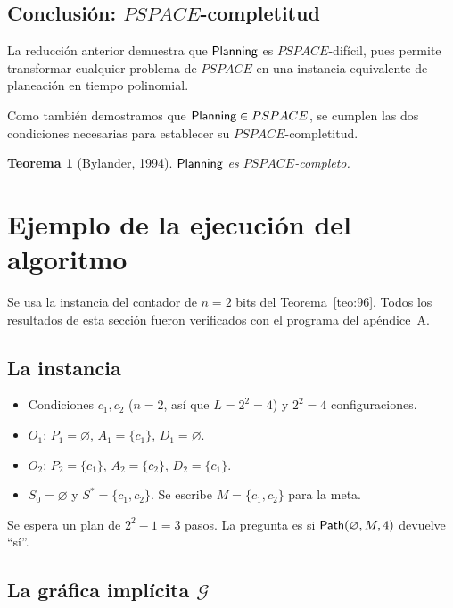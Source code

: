 \documentclass[11pt,letterpaper]{article}
\theoremstyle{plain}
\newtheorem{teorema}{Teorema}[section]
\theoremstyle{definition}
\theoremstyle{remark}
\newcommand{\vacio}{\varnothing}
\newcommand{\nombreMat}[1]{\ensuremath{\text{\fontencoding{OT1}\fontfamily{cmss}\upshape\selectfont #1}}}
\newcommand{\PSPACE}{\nombreMat{PSPACE}}
\newcommand{\NP}{\nombreMat{NP}}
\newcommand{\coNP}{\nombreMat{co-NP}}
\newcommand{\PLANNING}{\nombreMat{Planning}}
\newcommand{\Path}{\nombreMat{Path}}
\def\PSPACE{PSPACE}\def\NP{NP}\def\coNP{co-NP}%
\begin{document}
\subsection{Conclusión: $\PSPACE$-completitud}


La reducción anterior demuestra que
\PLANNING{} es $\PSPACE$-difícil, pues permite
transformar cualquier problema de $\PSPACE$
en una instancia equivalente de planeación
en tiempo polinomial.

Como también demostramos que
$\PLANNING\in\PSPACE$, se cumplen las dos
condiciones necesarias para establecer
su $\PSPACE$-completitud.


\begin{teorema}[Bylander, 1994]
$\PLANNING{}$ es $\PSPACE$-completo.
\end{teorema}

\newpage
\section{Ejemplo de la ejecución del algoritmo}\label{sec:ejemplo}

Se usa la instancia del contador de $n=2$ bits del Teorema~\ref{teo:96}. Todos los resultados de esta sección fueron verificados con el programa del apéndice~A.

\subsection{La instancia}

\begin{itemize}[leftmargin=1.5em,itemsep=1pt]
\item Condiciones $c_1,c_2$ ($n=2$, así que $L=2^{2}=4$) y $2^{2}=4$ configuraciones.
\item $O_1$: $P_1=\vacio$, $A_1=\{c_1\}$, $D_1=\vacio$.
\item $O_2$: $P_2=\{c_1\}$, $A_2=\{c_2\}$, $D_2=\{c_1\}$.
\item $S_0=\vacio$ y $S^{*}=\{c_1,c_2\}$. Se escribe $M=\{c_1,c_2\}$ para la meta.
\end{itemize}
Se espera un plan de $2^{2}-1=3$ pasos. La pregunta es si $\Path(\vacio,M,4)$ devuelve ``sí''.

\subsection{La gráfica implícita $\mathcal{G}$}
\end{document}
